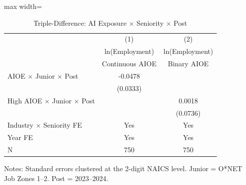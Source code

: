 \begin{table}[htbp]
\centering
\caption{Triple-Difference: AI Exposure $\times$ Seniority $\times$ Post}
\label{tab:ddd}
\begin{adjustbox}{max width=\textwidth}
\begin{tabular}{lcc}
\hline\hline
 & (1) & (2) \\
 & ln(Employment) & ln(Employment) \\
 & Continuous AIOE & Binary AIOE \\
\hline
AIOE $\times$ Junior $\times$ Post & -0.0478 & \\
 & (0.0333) & \\
High AIOE $\times$ Junior $\times$ Post & & 0.0018 \\
 & & (0.0736) \\
\hline
Industry $\times$ Seniority FE & Yes & Yes \\
Year FE & Yes & Yes \\
N & 750 & 750 \\
\hline\hline
\end{tabular}
\end{adjustbox}
\begin{tablenotes}\small
\item Notes: Standard errors clustered at the 2-digit NAICS level.
Junior = O*NET Job Zones 1--2. Post = 2023--2024.
\end{tablenotes}
\end{table}
